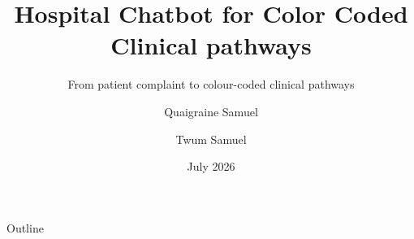 \documentclass[aspectratio=169,11pt]{beamer}
\title{Hospital Chatbot for Color Coded Clinical pathways}
\subtitle{From patient complaint to colour-coded clinical pathways}
\author{Quaigraine Samuel \and Twum Samuel}
\date{July 2026}
\begin{document}
\begin{frame}
  \titlepage
\end{frame}

\begin{frame}{Outline}
  \tableofcontents
\end{frame}



\end{document}
